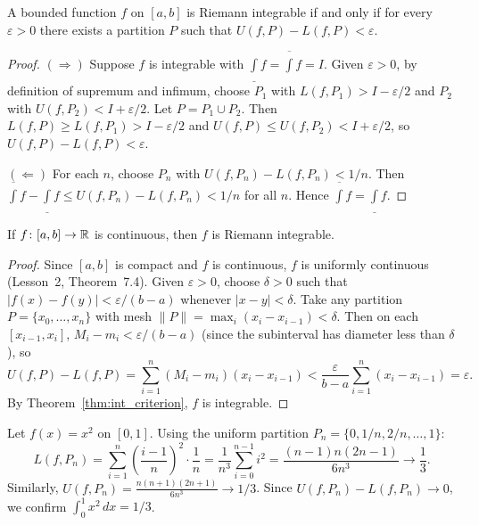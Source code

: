 \documentclass[11pt,a4paper]{article}
\begin{document}
\begin{theorem}
\label{thm:int_criterion}
A bounded function $f$ on $[a, b]$ is Riemann integrable if and only if
for every $\varepsilon > 0$ there exists a partition $P$ such that
$U(f, P) - L(f, P) < \varepsilon$.
\end{theorem}

\begin{proof}
$(\Rightarrow)$ Suppose $f$ is integrable with
$\underline{\int} f = \overline{\int} f = I$. Given $\varepsilon > 0$,
by definition of supremum and infimum, choose $P_1$ with
$L(f, P_1) > I - \varepsilon/2$ and $P_2$ with
$U(f, P_2) < I + \varepsilon/2$. Let $P = P_1 \cup P_2$. Then
$L(f, P) \ge L(f, P_1) > I - \varepsilon/2$ and
$U(f, P) \le U(f, P_2) < I + \varepsilon/2$, so
$U(f, P) - L(f, P) < \varepsilon$.

$(\Leftarrow)$ For each $n$, choose $P_n$ with
$U(f, P_n) - L(f, P_n) < 1/n$. Then
$\overline{\int} f - \underline{\int} f \le U(f, P_n) - L(f, P_n) < 1/n$
for all $n$. Hence $\overline{\int} f = \underline{\int} f$.
\end{proof}

\begin{theorem}
\label{thm:cont_integrable}
If $f \colon [a, b] \to \mathbb{R}$ is continuous, then $f$ is Riemann
integrable.
\end{theorem}

\begin{proof}
Since $[a, b]$ is compact and $f$ is continuous, $f$ is uniformly
continuous (Lesson~2, Theorem~7.4). Given $\varepsilon > 0$, choose
$\delta > 0$ such that $|f(x) - f(y)| < \varepsilon/(b - a)$ whenever
$|x - y| < \delta$. Take any partition $P = \{x_0, \ldots, x_n\}$ with
mesh $\|P\| = \max_i(x_i - x_{i-1}) < \delta$. Then on each
$[x_{i-1}, x_i]$, $M_i - m_i < \varepsilon/(b - a)$ (since the
subinterval has diameter less than $\delta$), so
\[
  U(f, P) - L(f, P) = \sum_{i=1}^n (M_i - m_i)(x_i - x_{i-1})
  < \frac{\varepsilon}{b - a} \sum_{i=1}^n (x_i - x_{i-1})
  = \varepsilon.
\]
By Theorem~\ref{thm:int_criterion}, $f$ is integrable.
\end{proof}

\begin{example}
\label{ex:integral_x_squared}
Let $f(x) = x^2$ on $[0, 1]$. Using the uniform partition
$P_n = \{0, 1/n, 2/n, \ldots, 1\}$:
\[
  L(f, P_n) = \sum_{i=1}^n \left(\frac{i-1}{n}\right)^2 \cdot \frac{1}{n}
  = \frac{1}{n^3}\sum_{i=0}^{n-1} i^2
  = \frac{(n-1)n(2n-1)}{6n^3} \to \frac{1}{3}.
\]
Similarly, $U(f, P_n) = \frac{n(n+1)(2n+1)}{6n^3} \to 1/3$. Since
$U(f, P_n) - L(f, P_n) \to 0$, we confirm $\int_0^1 x^2\,dx = 1/3$.
\end{example}
\end{document}

